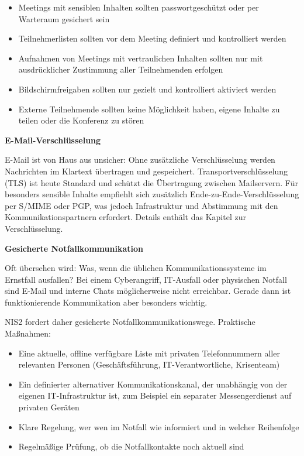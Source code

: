 \begin{itemize}
    \item Meetings mit sensiblen Inhalten sollten passwortgeschützt oder per Warteraum gesichert sein
    \item Teilnehmerlisten sollten vor dem Meeting definiert und kontrolliert werden
    \item Aufnahmen von Meetings mit vertraulichen Inhalten sollten nur mit ausdrücklicher Zustimmung aller Teilnehmenden erfolgen
    \item Bildschirmfreigaben sollten nur gezielt und kontrolliert aktiviert werden
    \item Externe Teilnehmende sollten keine Möglichkeit haben, eigene Inhalte zu teilen oder die Konferenz zu stören
\end{itemize}

\textbf{E-Mail-Verschlüsselung}

E-Mail ist von Haus aus unsicher: Ohne zusätzliche Verschlüsselung werden Nachrichten im Klartext übertragen und gespeichert. Transportverschlüsselung (TLS) ist heute Standard und schützt die Übertragung zwischen Mailservern. Für besonders sensible Inhalte empfiehlt sich zusätzlich Ende-zu-Ende-Verschlüsselung per S/MIME oder PGP, was jedoch Infrastruktur und Abstimmung mit den Kommunikationspartnern erfordert. Details enthält das Kapitel zur Verschlüsselung.

\textbf{Gesicherte Notfallkommunikation}

Oft übersehen wird: Was, wenn die üblichen Kommunikationssysteme im Ernstfall ausfallen? Bei einem Cyberangriff, IT-Ausfall oder physischen Notfall sind E-Mail und interne Chats möglicherweise nicht erreichbar. Gerade dann ist funktionierende Kommunikation aber besonders wichtig.

NIS2 fordert daher gesicherte Notfallkommunikationswege. Praktische Maßnahmen:

\begin{itemize}
    \item Eine aktuelle, offline verfügbare Liste mit privaten Telefonnummern aller relevanten Personen (Geschäftsführung, IT-Verantwortliche, Krisenteam)
    \item Ein definierter alternativer Kommunikationskanal, der unabhängig von der eigenen IT-Infrastruktur ist, zum Beispiel ein separater Messengerdienst auf privaten Geräten
    \item Klare Regelung, wer wen im Notfall wie informiert und in welcher Reihenfolge
    \item Regelmäßige Prüfung, ob die Notfallkontakte noch aktuell sind
\end{itemize}

